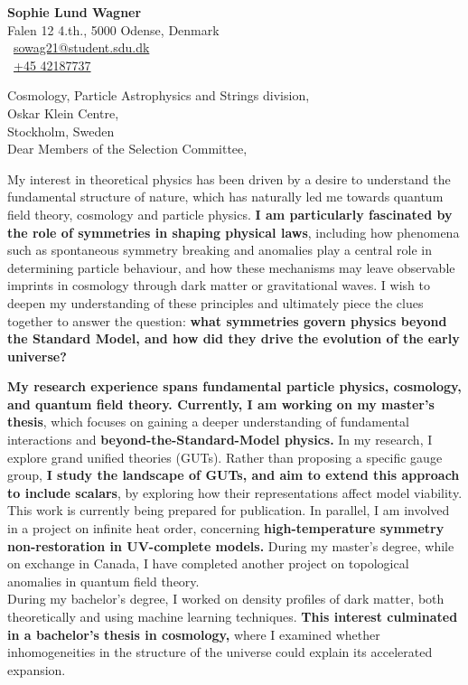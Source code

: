 \documentclass[a4paper,11pt]{letter}
\date{\today}
\begin{document}
\pagestyle{empty}

\begin{flushright}
\textbf{Sophie Lund Wagner } \\
   Falen 12 4.th., 5000 Odense, Denmark \\
    \faEnvelope\ \href{mailto:sowag21@student.sdu.dk}{sowag21@student.sdu.dk} \\
    \faPhone\ \href{tel:+45 42187737}{+45 42187737} \\
\end{flushright}

Cosmology, Particle Astrophysics and Strings division, \\
Oskar Klein Centre, \\
Stockholm, Sweden \\

Dear Members of the Selection Committee,

My interest in theoretical physics has been driven by a desire to understand the fundamental structure of nature, which has naturally led me towards quantum field theory, cosmology and particle physics. \textbf{I am particularly fascinated by the role of symmetries in shaping physical laws}, including how phenomena such as spontaneous symmetry breaking and anomalies play a central role in determining particle behaviour, and how these mechanisms may leave observable imprints in cosmology through dark matter or gravitational waves. I wish to deepen my understanding of these principles and ultimately piece the clues together to answer the question: \textbf{what symmetries govern physics beyond the Standard Model, and how did they drive the evolution of the early universe?} 

\textbf{My research experience spans fundamental particle physics, cosmology, and quantum field theory. Currently, I am working on my master’s thesis}, which focuses on gaining a deeper understanding of fundamental interactions and \textbf{beyond-the-Standard-Model physics.} In my research, I explore grand unified theories (GUTs). Rather than proposing a specific gauge group, \textbf{I study the landscape of GUTs, and aim to extend this approach to include scalars}, by exploring how their representations affect model viability. This work is currently being prepared for publication. In parallel, I am involved in a project on infinite heat order, concerning \textbf{high-temperature symmetry non-restoration in UV-complete models.} During my master’s degree, while on exchange in Canada, I have completed another project on topological anomalies in quantum field theory. \\
During my bachelor's degree, I worked on density profiles of dark matter, both theoretically and using machine learning techniques. \textbf{This interest culminated in a bachelor’s thesis in cosmology,} where I examined whether inhomogeneities in the structure of the universe could explain its accelerated expansion.
\end{document}
